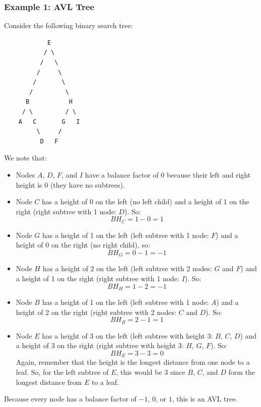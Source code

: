 \documentclass[letterpaper]{article}
\begin{document}
\subsubsection{Example 1: AVL Tree}
Consider the following binary search tree: 
\begin{verbatim}
            E
           / \ 
          /   \ 
         /     \  
        /       \ 
       /         \
      B           H
     / \         / \
    A   C       G   I 
         \     /
          D   F
\end{verbatim}
We note that: 
\begin{itemize}
    \item Nodes $A$, $D$, $F$, and $I$ have a balance factor of $0$ because their left and right height is 0 (they have no subtrees). 
    \item Node $C$ has a height of 0 on the left (no left child) and a height of 1 on the right (right subtree with 1 node: $D$). So:
    \[BH_{C} = 1 - 0 = 1\]
    \item Node $G$ has a height of 1 on the left (left subtree with 1 node: $F$) and a height of 0 on the right (no right child), so: 
    \[BH_{G} = 0 - 1 = -1\]
    \item Node $H$ has a height of 2 on the left (left subtree with 2 nodes: $G$ and $F$) and a height of 1 on the right (right subtree with 1 node: $I$). So: 
    \[BH_{H} = 1 - 2 = -1\]
    \item Node $B$ has a height of 1 on the left (left subtree with 1 node: $A$) and a height of 2 on the right (right subtree with 2 nodes: $C$ and $D$). So: 
    \[BH_{B} = 2 - 1 = 1\]
    \item Node $E$ has a height of 3 on the left (left subtree with height 3: $B$, $C$, $D$) and a height of 3 on the right (right subtree with height 3: $H$, $G$, $F$). So: 
    \[BH_{E} = 3 - 3 = 0\]
    Again, remember that the height is the longest distance from one node to a leaf. So, for the left subtree of $E$, this would be 3 since $B$, $C$, and $D$ form the longest distance from $E$ to a leaf. 
\end{itemize}
Because every node has a balance factor of $-1$, $0$, or $1$, this is an AVL tree. 
\end{document}
